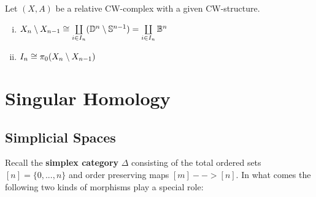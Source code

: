 	\begin{lemma}
		Let $(X,A)$ be a relative CW-complex with a given CW-structure. 
		\begin{enumerate}[(i)]
			\item{
				$X_n \setminus X_{n-1} \cong \coprod \limits_{i \in I_n} (\mathbb{D}^n \setminus \mathbb{S}^{n-1}) = \coprod \limits_{i \in I_n} \mathbb{B}^n$
			}
			\item{
				$I_n \cong \pi_0(X_n \setminus X_{n-1})$
			}
		\end{enumerate}
	\end{lemma}


	\newpage
	\section{Singular Homology}
	\subsection{Simplicial Spaces}

	Recall the \textbf{simplex category} $\Delta$ consisting of the total ordered sets $[n] = \{0,...,n\}$ and order preserving maps $[m] --> [n]$. In what comes the following two kinds of morphisms play a special role:

